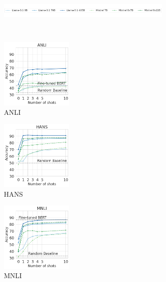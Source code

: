 \begin{figure}[t]
    \begin{subfigure}[b]{\textwidth}
        \hspace{5mm}
        \includegraphics[width=0.95\textwidth]{figures/legend}
        \vspace{-3mm}
    \end{subfigure}\\
    \begin{subfigure}[b]{0.217\textwidth}
    \centering
    \includegraphics[height=3.45cm]{figures/anli}
    \caption{ANLI}
    \end{subfigure}
    \label{fig:anli}
    \begin{subfigure}[b]{0.19\textwidth}
    \centering
    \includegraphics[height=3.45cm, trim=25mm 0 0 0, clip]{figures/hansnli}
    \caption{HANS}
    \label{fig:hans}
    \end{subfigure}
    \begin{subfigure}[b]{0.19\textwidth}
    \centering
    \includegraphics[height=3.45cm, trim=25mm 0 0 0, clip]{figures/mnli_matched}
    \caption{MNLI}
    \label{fig:mnli}
    \end{subfigure}
    \begin{subfigure}[b]{0.19\textwidth}
    \centering

\end{subfigure}
\end{figure}
